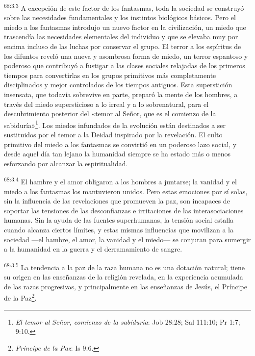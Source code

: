 \par
\textsuperscript{68:3.3} A excepción de este factor de los fantasmas, toda la sociedad se construyó sobre las necesidades fundamentales y los instintos biológicos básicos. Pero el miedo a los fantasmas introdujo un nuevo factor en la civilización, un miedo que trascendía las necesidades elementales del individuo y que se elevaba muy por encima incluso de las luchas por conservar el grupo. El terror a los espíritus de los difuntos reveló una nueva y asombrosa forma de miedo, un terror espantoso y poderoso que contribuyó a fustigar a las clases sociales relajadas de los primeros tiempos para convertirlas en los grupos primitivos más completamente disciplinados y mejor controlados de los tiempos antiguos. Esta superstición insensata, que todavía sobrevive en parte, preparó la mente de los hombres, a través del miedo supersticioso a lo irreal y a lo sobrenatural, para el descubrimiento posterior del «temor al Señor, que es el comienzo de la sabiduría»\footnote{\textit{El temor al Señor, comienzo de la sabiduría}: Job 28:28; Sal 111:10; Pr 1:7; 9:10.}. Los miedos infundados de la evolución están destinados a ser sustituidos por el temor a la Deidad inspirado por la revelación. El culto primitivo del miedo a los fantasmas se convirtió en un poderoso lazo social, y desde aquel día tan lejano la humanidad siempre se ha estado más o menos esforzando por alcanzar la espiritualidad.

\par
\textsuperscript{68:3.4} El hambre y el amor obligaron a los hombres a juntarse; la vanidad y el miedo a los fantasmas los mantuvieron unidos. Pero estas emociones por sí solas, sin la influencia de las revelaciones que promueven la paz, son incapaces de soportar las tensiones de las desconfianzas e irritaciones de las interasociaciones humanas. Sin la ayuda de las fuentes superhumanas, la tensión social estalla cuando alcanza ciertos límites, y estas mismas influencias que movilizan a la sociedad ---el hambre, el amor, la vanidad y el miedo--- se conjuran para sumergir a la humanidad en la guerra y el derramamiento de sangre.

\par
\textsuperscript{68:3.5} La tendencia a la paz de la raza humana no es una dotación natural; tiene su origen en las enseñanzas de la religión revelada, en la experiencia acumulada de las razas progresivas, y principalmente en las enseñanzas de Jesús, el Príncipe de la Paz\footnote{\textit{Príncipe de la Paz}: Is 9:6.}.


